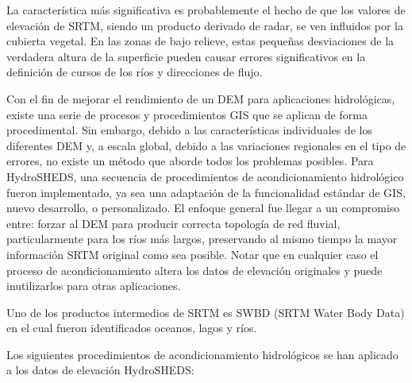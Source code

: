 \documentclass[10pt,a4paper, twoside]{report}
\begin{document}
La característica más significativa es probablemente el hecho de que los valores de elevación de SRTM, siendo un producto derivado de radar, se ven influidos por la cubierta vegetal. En las zonas de bajo relieve, estas pequeñas desviaciones de la verdadera altura de la superficie pueden causar errores significativos en la definición de cursos de los ríos y direcciones de flujo.


Con el fin de mejorar el rendimiento de un DEM para aplicaciones hidrológicas, existe una serie de procesos y procedimientos GIS que se aplican de forma procedimental. Sin embargo, debido a las características individuales de los diferentes DEM y, a escala global, debido a las variaciones regionales en el tipo de errores, no existe un método que aborde todos los problemas posibles. Para HydroSHEDS, una secuencia de procedimientos de acondicionamiento hidrológico fueron implementado, ya sea una adaptación de la funcionalidad estándar de GIS, nuevo desarrollo, o personalizado. El enfoque general fue llegar a un compromiso entre: forzar al DEM para producir correcta topología de red fluvial, particularmente para los ríos más largos, preservando al mismo tiempo la mayor información SRTM original como sea posible. Notar que en cualquier caso el proceso de acondicionamiento altera los datos de elevación originales y puede inutilizarlos para otras aplicaciones.

Uno de los productos intermedios de SRTM es SWBD (SRTM Water Body Data) en el cual fueron identificados oceanos, lagos y ríos.

Los siguientes procedimientos de acondicionamiento hidrológicos se han aplicado a los datos de elevación HydroSHEDS:
\end{document}
